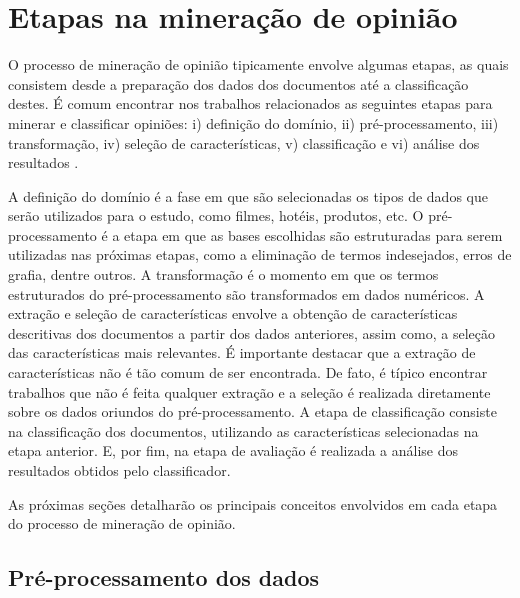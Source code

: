 \documentclass[template.tex]{subfiles}
\begin{document}
\section{Etapas na mineração de opinião}


O processo de mineração de opinião tipicamente envolve algumas etapas, as quais consistem desde a preparação dos dados dos documentos até a classificação destes. É comum encontrar nos trabalhos relacionados as seguintes etapas para minerar e classificar opiniões:  i) definição do domínio, ii) pré-processamento, iii) transformação, iv) seleção de características, v) classificação e vi) análise dos resultados \cite{moraes2012document}. 

A definição do domínio é a fase em que são selecionadas os tipos de dados que serão utilizados para o estudo, como filmes, hotéis, produtos, etc. O pré-processamento é a etapa em que as bases escolhidas são estruturadas para serem utilizadas nas próximas etapas, como a eliminação de termos indesejados, erros de grafia, dentre outros. A transformação é o momento em que os termos estruturados do pré-processamento são transformados em dados numéricos. A extração e seleção de características envolve a obtenção de características descritivas dos documentos a partir dos dados anteriores, assim como, a seleção das características mais relevantes. É importante destacar que a extração de características não é tão comum de ser encontrada. De fato, é típico encontrar trabalhos que não é feita qualquer extração e a seleção é realizada diretamente sobre os dados oriundos do pré-processamento. A etapa de classificação consiste na classificação dos documentos, utilizando as características selecionadas na etapa anterior. E, por fim, na etapa de avaliação é realizada a análise dos resultados obtidos pelo classificador.

As próximas seções detalharão os principais conceitos envolvidos em cada etapa do processo de mineração de opinião.

\subsection{Pré-processamento dos dados}
\end{document}
